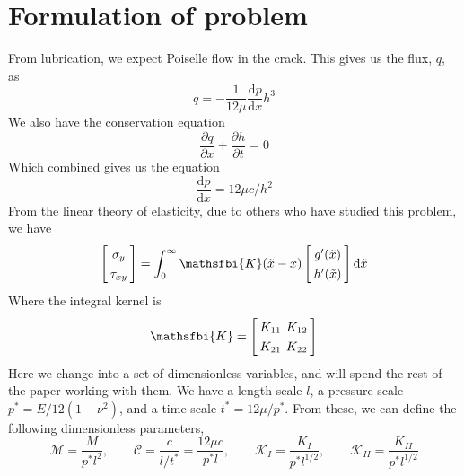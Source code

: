 \documentclass{jfm}
\newcommand{\mrd}{\mathrm{d}}
\begin{document}
\section{Formulation of problem}\label{sec:formulation_of_problem}
From lubrication, we expect Poiselle flow in the crack. This gives us the
flux, $q$, as 
\begin{equation}
q = - \frac{1}{12\mu}\frac{\mrd p}{\mrd x}h^3
\end{equation}
We also have the conservation equation
%
\begin{equation}
\frac{\partial q}{\partial x} + \frac{\partial h}{\partial t} = 0 
\end{equation}
Which combined gives us the equation
\begin{equation}
\frac{\mrd p}{\mrd x} = 12\mu c / h^2
\end{equation}
From the linear theory of elasticity, due to others who have studied this 
problem, we have
\begin{equation}
\setlength{\arraycolsep}{2pt}
\left[ \begin{array}{c} 
\sigma_y \\ \tau_{xy}
\end{array} \right]
= \int_0^{\infty} \mathsfbi{K}(\tilde{x}-x) 
\left[ \begin{array}{c} 
g'(\tilde{x}) \\ h'(\tilde{x})
\end{array} \right]
\mrd \tilde{x} 
\end{equation}
%
Where the integral kernel is
\begin{equation}
\setlength{\arraycolsep}{2pt}
\renewcommand{\arraystretch}{1.3}
\mathsfbi{K} = \left[
\begin{array}{ccccc}
  K_{11}  &  K_{12}  \\
K_{21} & K_{22} \\
\end{array}  \right] 
\end{equation}
Here we change into a set of dimensionless variables, and will spend the 
rest of the paper working with them.
We have a length scale $l$, a pressure scale $p^* = E/12(1-\nu^2)$, and a
time scale $t^* = 12\mu /p^*$.
From these, we can define the following dimensionless parameters,
\begin{equation}
\mathcal{M} = \frac{M}{p^* l^2}, \qquad \mathcal{C} = \frac{c}{l/t^*}
= \frac{12\mu c}{p^* l}, \qquad \mathcal{K}_I = \frac{K_I}{p^* l^{1/2}},
\qquad \mathcal{K}_{II} = \frac{K_{II}}{p^* l^{1/2}} 
\end{equation}
\end{document}
